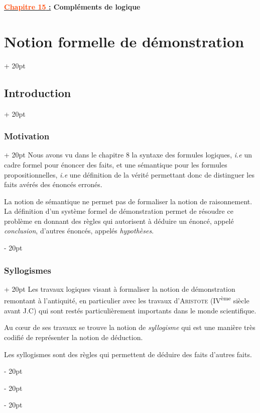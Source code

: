 \documentclass[a4paper, 12pt, twoside]{article}
\newcommand{\Emph}{\textcolor{ff4500}}
\newcommand{\ind}[1][20pt]{\advance\leftskip + #1}
\newcommand{\deind}[1][20pt]{\advance\leftskip - #1}
\newenvironment{indt}[2][20pt]{#2 \par \ind[#1]}{\par \deind} %
\newcommand{\thetitle}[2]{\begin{center}\textbf{{\LARGE \underline{\Emph{#1} :}} {\Large #2}}\end{center}}
\begin{document}
    
    \thetitle{Chapitre 15}{Compléments de logique}
    
    \tableofcontents
    \newpage
    
    \begin{indt}{\section{Notion formelle de démonstration}}
        \begin{indt}{\subsection{Introduction}}
            \begin{indt}{\subsubsection{Motivation}}
                Nous avons vu dans le chapitre 8 la syntaxe des formules logiques, \textit{i.e} un cadre formel pour énoncer des faits, et une sémantique pour les formules propositionnelles, \textit{i.e} une définition de la vérité permettant donc de distinguer les faits avérés des énoncés erronés.

                La notion de sémantique ne permet pas de formaliser la notion de raisonnement. La définition d'un système formel de démonstration permet de résoudre ce problème en donnant des règles qui autorisent à déduire un énoncé, appelé \emph{conclusion}, d'autres énoncés, appelés \emph{hypothèses}.
            \end{indt}

            \vspace{12pt}
            
            \begin{indt}{\subsubsection{Syllogismes}}
                Les travaux logiques visant à formaliser la notion de démonstration remontant à l'antiquité, en particulier avec les travaux d'\textsc{Aristote} (IV\textsuperscript{ème} siècle avant J.C) qui sont restés particulièrement importants dans le monde scientifique.

                Au c\oe ur de ses travaux se trouve la notion de \emph{syllogisme} qui est une manière très codifié de représenter la notion de déduction.

                Les syllogismes sont des règles qui permettent de déduire des faits d'autres faits.


\end{indt}
\end{indt}
\end{indt}
\end{document}
